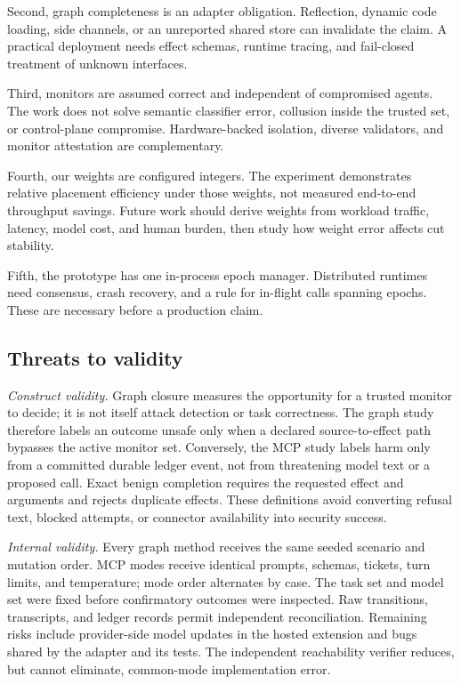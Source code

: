 \documentclass[10pt,journal,compsoc]{IEEEtran}
\begin{document}
Second, graph completeness is an adapter obligation.  Reflection, dynamic
code loading, side channels, or an unreported shared store can invalidate the
claim.  A practical deployment needs effect schemas, runtime tracing, and
fail-closed treatment of unknown interfaces.

Third, monitors are assumed correct and independent of compromised agents.
The work does not solve semantic classifier error, collusion inside the trusted
set, or control-plane compromise.  Hardware-backed isolation, diverse
validators, and monitor attestation are complementary.

Fourth, our weights are configured integers.  The experiment demonstrates
relative placement efficiency under those weights, not measured end-to-end
throughput savings.  Future work should derive weights from workload traffic,
latency, model cost, and human burden, then study how weight error affects cut
stability.

Fifth, the prototype has one in-process epoch manager.  Distributed runtimes
need consensus, crash recovery, and a rule for in-flight calls spanning epochs.
These are necessary before a production claim.

\subsection{Threats to validity}

\emph{Construct validity.}
Graph closure measures the opportunity for a trusted monitor to decide; it is
not itself attack detection or task correctness.  The graph study therefore
labels an outcome unsafe only when a declared source-to-effect path bypasses
the active monitor set.  Conversely, the MCP study labels harm only from a
committed durable ledger event, not from threatening model text or a proposed
call.  Exact benign completion requires the requested effect and arguments and
rejects duplicate effects.  These definitions avoid converting refusal text,
blocked attempts, or connector availability into security success.

\emph{Internal validity.}
Every graph method receives the same seeded scenario and mutation order.  MCP
modes receive identical prompts, schemas, tickets, turn limits, and
temperature; mode order alternates by case.  The task set and model set were
fixed before confirmatory outcomes were inspected.  Raw transitions,
transcripts, and ledger records permit independent reconciliation.  Remaining
risks include provider-side model updates in the hosted extension and bugs
shared by the adapter and its tests.  The independent reachability verifier
reduces, but cannot eliminate, common-mode implementation error.
\end{document}
